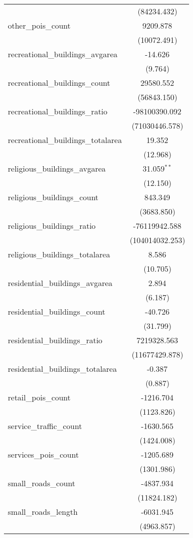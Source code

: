 \begin{table}[!htbp]
\begin{tabular}{@{\extracolsep{5pt}}lc}
  & (84234.432) \\
 other_pois_count & 9209.878$^{}$ \\
  & (10072.491) \\
 recreational_buildings_avgarea & -14.626$^{}$ \\
  & (9.764) \\
 recreational_buildings_count & 29580.552$^{}$ \\
  & (56843.150) \\
 recreational_buildings_ratio & -98100390.092$^{}$ \\
  & (71030446.578) \\
 recreational_buildings_totalarea & 19.352$^{}$ \\
  & (12.968) \\
 religious_buildings_avgarea & 31.059$^{**}$ \\
  & (12.150) \\
 religious_buildings_count & 843.349$^{}$ \\
  & (3683.850) \\
 religious_buildings_ratio & -76119942.588$^{}$ \\
  & (104014032.253) \\
 religious_buildings_totalarea & 8.586$^{}$ \\
  & (10.705) \\
 residential_buildings_avgarea & 2.894$^{}$ \\
  & (6.187) \\
 residential_buildings_count & -40.726$^{}$ \\
  & (31.799) \\
 residential_buildings_ratio & 7219328.563$^{}$ \\
  & (11677429.878) \\
 residential_buildings_totalarea & -0.387$^{}$ \\
  & (0.887) \\
 retail_pois_count & -1216.704$^{}$ \\
  & (1123.826) \\
 service_traffic_count & -1630.565$^{}$ \\
  & (1424.008) \\
 services_pois_count & -1205.689$^{}$ \\
  & (1301.986) \\
 small_roads_count & -4837.934$^{}$ \\
  & (11824.182) \\
 small_roads_length & -6031.945$^{}$ \\
  & (4963.857) \\

\end{tabular}
\end{table}
